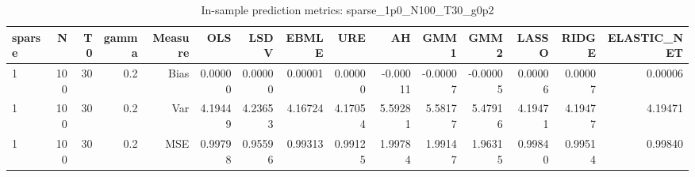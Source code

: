 \begin{table}[!htbp]\centering
\caption{In-sample prediction metrics: sparse_1p0_N100_T30_g0p2}
\label{tab:table2_sparse_1p0_N100_T30_g0p2}
\begin{tabular}{lrrrrrrrrrrrrrr}
\hline
sparse & N & T0 & gamma & Measure & OLS & LSDV & EBMLE & URE & AH & GMM1 & GMM2 & LASSO & RIDGE & ELASTIC_NET \\
\hline
1 & 100 & 30 & 0.2 & Bias & 0.00000 & 0.00000 & 0.00001 & 0.00000 & -0.00011 & -0.00007 & -0.00005 & 0.00006 & 0.00007 & 0.00006 \\
1 & 100 & 30 & 0.2 & Var & 4.19449 & 4.23653 & 4.16724 & 4.17054 & 5.59281 & 5.58177 & 5.47916 & 4.19471 & 4.19477 & 4.19471 \\
1 & 100 & 30 & 0.2 & MSE & 0.99798 & 0.95596 & 0.99313 & 0.99125 & 1.99784 & 1.99147 & 1.96315 & 0.99840 & 0.99514 & 0.99840 \\
\hline
\end{tabular}
\end{table}

